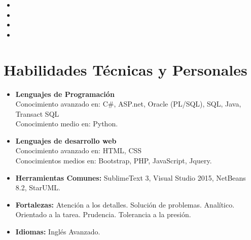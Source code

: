 \documentclass[11pt,a4paper,roman]{moderncv}        %
\begin{document}
\begin{itemize}

\item{}

\item{}

\item{}

\item{}

\end{itemize}

\section{Habilidades Técnicas y Personales}

\vspace{3pt}

\begin{itemize}

\item \textbf{Lenguajes de Programación} \\Conocimiento avanzado en: C\#, ASP.net, Oracle (PL/SQL), SQL, Java, Transact SQL\\Conocimiento medio en: Python.

\vspace{3pt}

\item \textbf{Lenguajes de desarrollo web} \\Conocimiento avanzado en: HTML, CSS\\
 Conocimientos medios en: Bootstrap, PHP, JavaScript, Jquery.

\vspace{3pt}

\item \textbf{Herramientas Comunes:} SublimeText 3, Visual Studio 2015, NetBeans 8.2, StarUML.

\vspace{3pt}

\item \textbf{Fortalezas:} Atención a los detalles. Solución de problemas. Analítico. Orientado a la tarea. Prudencia. Tolerancia a la presión.

\vspace{3pt}

\item \textbf{Idiomas:} Inglés Avanzado.

\end{itemize}
\end{document}
